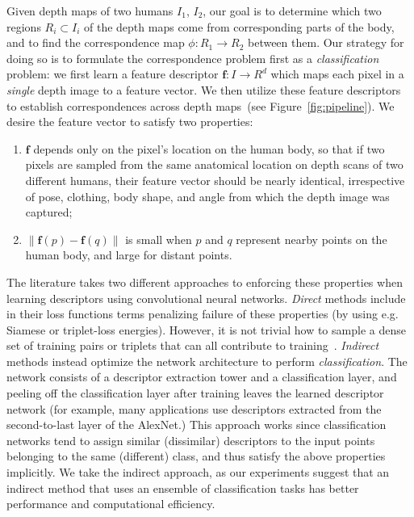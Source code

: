 \documentclass[10pt,twocolumn,letterpaper]{article}
\begin{document}
Given depth maps of two humans $I_1$, $I_2$, our goal is to determine which two regions $R_i\subset I_i$ of the depth maps come from corresponding parts of the body, and to find the correspondence map $\phi: R_1\to R_2$ between them. Our strategy for doing so is to formulate the correspondence problem first as a \emph{classification} problem: we first learn a feature descriptor $\mathbf{f}: I \rightarrow R^d$ which maps each pixel in a \emph{single} depth image to a feature vector. We then utilize these feature descriptors to establish correspondences across depth maps~(see Figure~\ref{fig:pipeline}). We desire the feature vector to satisfy two properties:
\begin{enumerate}
\item $\mathbf{f}$ depends only on the pixel's location on the human body, so that if two pixels are sampled from the same anatomical location on depth scans of two different humans, their feature vector should be nearly identical, irrespective of pose, clothing, body shape, and angle from which the depth image was captured;
\item $\|\mathbf{f}(p)-\mathbf{f}(q)\|$ is small when $p$ and $q$ represent nearby points on the human body, and large for distant points.
\end{enumerate}
The literature takes two different approaches to enforcing these properties when learning descriptors using convolutional neural networks. \emph{Direct} methods include in their loss functions terms penalizing failure of these properties (by using e.g. Siamese or triplet-loss energies). However, it is not trivial how to sample a dense set of training pairs or triplets that can all contribute to training~\cite{SchroffKP15}. \emph{Indirect} methods instead optimize the network architecture to perform \emph{classification}. The network consists of a descriptor extraction tower and a classification layer, and peeling off the classification layer after training leaves the learned descriptor network (for example, many applications use descriptors extracted from the second-to-last layer of the AlexNet.) This approach works since classification networks tend to assign similar (dissimilar) descriptors to the input points belonging to the same (different) class, and thus satisfy the above properties implicitly. We take the indirect approach, as our experiments suggest that an indirect method that uses an ensemble of classification tasks has better performance and computational efficiency.
\end{document}
